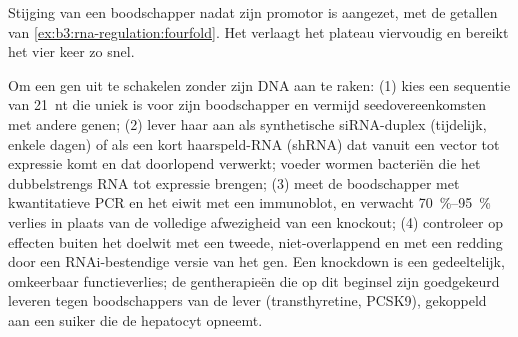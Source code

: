 \begin{omfigure}

{\small Stijging van een boodschapper nadat zijn promotor is
aangezet, met de getallen van \cref{ex:b3:rna-regulation:fourfold}.
Het  verlaagt het plateau viervoudig en bereikt het vier keer
zo snel.}
\end{omfigure}

\begin{method}\label{met:b3:rna-regulation:knockdown}
Om een gen uit te schakelen zonder zijn DNA aan te raken: (1) kies een
sequentie van \qty{21}{nt} die uniek is voor zijn boodschapper en
vermijd seedovereenkomsten met andere genen; (2) lever haar aan als
synthetische siRNA-duplex (tijdelijk, enkele dagen) of als een kort
haarspeld-RNA (shRNA) dat vanuit een vector tot expressie komt en dat
 doorlopend verwerkt; voeder wormen bacteriën die het
dubbelstrengs RNA tot expressie brengen; (3) meet de boodschapper met
kwantitatieve PCR en het eiwit met een immunoblot, en verwacht
\qtyrange{70}{95}{\%} verlies in plaats van de volledige afwezigheid
van een knockout; (4) controleer op effecten buiten het doelwit met
een tweede, niet-overlappend  en met een redding door een
RNAi-bestendige versie van het gen. Een knockdown is een gedeeltelijk,
omkeerbaar functieverlies; de gentherapieën die op dit beginsel zijn
goedgekeurd leveren  tegen boodschappers van de lever
(transthyretine, PCSK9), gekoppeld aan een suiker die de hepatocyt
opneemt.
\end{method}

